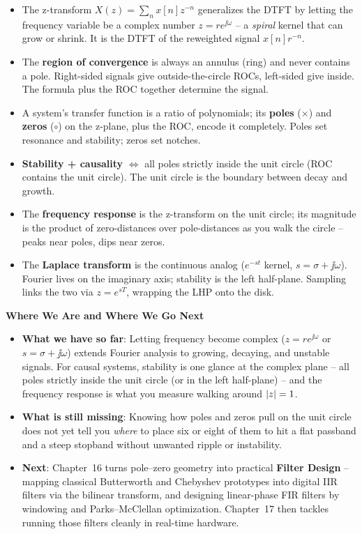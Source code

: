 \begin{itemize}
\item The z-transform $X(z)=\sum_n x[n]z^{-n}$ generalizes the DTFT by letting the
frequency variable be a complex number $z=re^{\jj\omega}$ -- a \emph{spiral} kernel that
can grow or shrink. It is the DTFT of the reweighted signal $x[n]r^{-n}$.
\item The \textbf{region of convergence} is always an annulus (ring) and never contains a
pole. Right-sided signals give outside-the-circle ROCs, left-sided give inside. The
formula plus the ROC together determine the signal.
\item A system's transfer function is a ratio of polynomials; its \textbf{poles}
($\times$) and \textbf{zeros} ($\circ$) on the z-plane, plus the ROC, encode it
completely. Poles set resonance and stability; zeros set notches.
\item \textbf{Stability + causality} $\iff$ all poles strictly inside the unit circle (ROC
contains the unit circle). The unit circle is the boundary between decay and growth.
\item The \textbf{frequency response} is the z-transform on the unit circle; its magnitude
is the product of zero-distances over pole-distances as you walk the circle -- peaks near
poles, dips near zeros.
\item The \textbf{Laplace transform} is the continuous analog ($e^{-st}$ kernel,
$s=\sigma+\jj\omega$). Fourier lives on the imaginary axis; stability is the left
half-plane. Sampling links the two via $z=e^{sT}$, wrapping the LHP onto the disk.
\end{itemize}

\begin{connectionbox}
\textbf{Where We Are and Where We Go Next}
\begin{itemize}
  \item \textbf{What we have so far}: Letting frequency become complex ($z = r e^{\jj\omega}$ or
  $s = \sigma + \jj\omega$) extends Fourier analysis to growing, decaying, and unstable signals.
  For causal systems, stability is one glance at the complex plane -- all poles strictly inside the
  unit circle (or in the left half-plane) -- and the frequency response is what you measure walking
  around $\lvert z\rvert = 1$.
  \item \textbf{What is still missing}: Knowing how poles and zeros pull on the unit circle does not
  yet tell you \emph{where} to place six or eight of them to hit a flat passband and a steep
  stopband without unwanted ripple or instability.
  \item \textbf{Next}: Chapter~16 turns pole--zero geometry into practical \textbf{Filter Design} --
  mapping classical Butterworth and Chebyshev prototypes into digital IIR filters via the bilinear
  transform, and designing linear-phase FIR filters by windowing and Parks--McClellan optimization.
  Chapter~17 then tackles running those filters cleanly in real-time hardware.
\end{itemize}
\end{connectionbox}

